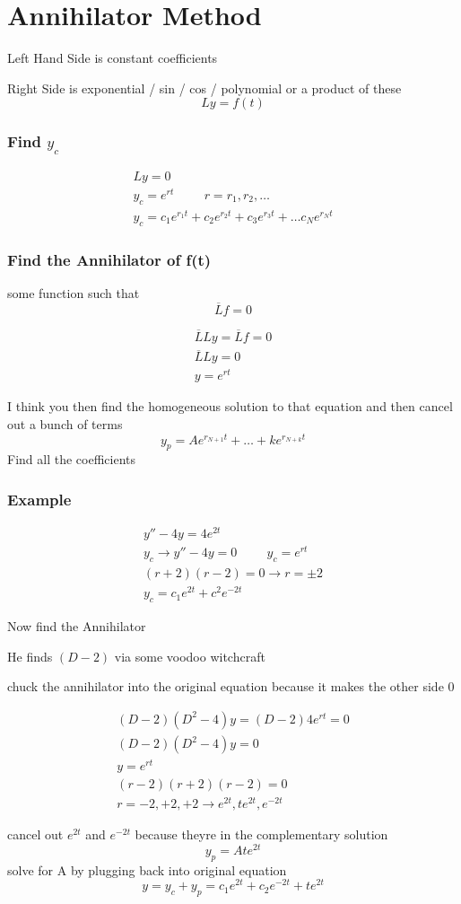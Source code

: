 \documentclass[fleqn]{report}
\newcommand{\hp}{\hspace{1cm}}
\newcommand{\equations} [1] {
\begin{gather*}
#1
\end{gather*}
}
\begin{document}
\chapter{Annihilator Method}
Left Hand Side is constant coefficients

Right Side is exponential / sin / cos / polynomial or a product of these
\[
Ly = f(t)
\]

\subsection{Find $y_c$}
\equations{
L y = 0
\\
y_c = e^{rt}
\hp
r = r_1, r_2, \ldots
\\
y_c = c_1 e^{r_1t} + c_2 e^{r_2t} + c_3 e^{r_3t} + \ldots c_N e^{r_Nt} 
}

\subsection{Find the Annihilator of f(t)}
some function such that
\[
\overline{L} f = 0
\]
\equations{
\overline{L} L y = \overline{L} f = 0 
\\
\overline{L} L y = 0
\\
y = e^{rt}
}
I think you then find the homogeneous solution to that equation and then cancel out a bunch of terms
\[
y_p = Ae^{r_{N + 1}t} + \ldots + ke^{r_{N + k}t}
\]
Find all the coefficients

\subsection{Example}
\equations{
y'' - 4y = 4e^{2t}
\\
y_c \rightarrow y'' - 4y = 0 
\hp
y_c = e^{rt}
\\
(r + 2)(r - 2) = 0 \rightarrow r = \pm 2
\\
y_c = c_1 e^{2t} + c^2 e^{-2t}
}
Now find the Annihilator 

He finds $(D - 2)$ via some voodoo witchcraft

chuck the annihilator into the original equation because it makes the other side 0
 \equations{
 (D - 2)(D^2 - 4)y = (D - 2)4e^{rt} = 0
 \\
  (D - 2)(D^2 - 4)y = 0
  \\
  y = e^{rt}
  \\
  (r - 2)(r + 2)(r- 2) = 0
  \\
  r = -2, +2, +2
  \rightarrow
  e^{2t}, te^{2t}, e^{-2t}
}
cancel out $e^{2t}$ and $e^{-2t}$ because theyre in the complementary solution
 \[
  y_p = Ate^{2t}
 \]
 solve for A by plugging back into original equation
 \[
 y = y_c + y_p = c_1 e^{2t} + c_2 e^{-2t} + te^{2t}
 \]
 
\end{document}

